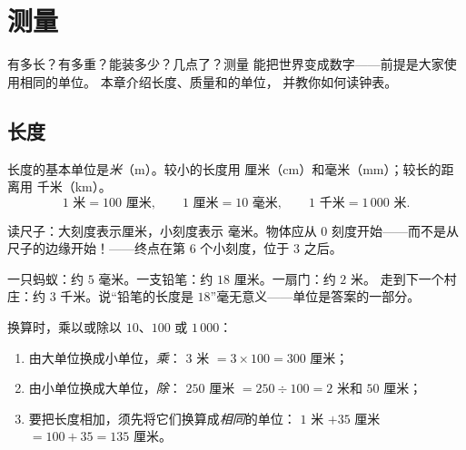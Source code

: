 \chapter{测量}\label{ch:g3:measure}

有多长？有多重？能装多少？几点了？测量
能把世界变成数字——前提是大家使用相同的单位。
本章介绍长度、质量和的单位，
并教你如何读钟表。

\section{长度}

\begin{definition}[长度单位]\label{def:g3:measure:length}
长度的基本单位是\emph{米}（m）。较小的长度用
厘米（cm）和毫米（mm）；较长的距离用
千米（km）。
\[
1 \text{ 米} = 100 \text{ 厘米}, \qquad
1 \text{ 厘米} = 10 \text{ 毫米}, \qquad
1 \text{ 千米} = 1\,000 \text{ 米}.
\]
\end{definition}

\begin{omfigure}

{\small 读尺子：大刻度表示厘米，小刻度表示
毫米。物体应从 $0$ 刻度开始——而不是从
尺子的边缘开始！——终点在第 $6$ 个小刻度，位于 $3$ 之后。}
\end{omfigure}

\begin{example}[选择合适的单位]\label{ex:g3:measure:choose}
一只蚂蚁：约 $5$ 毫米。一支铅笔：约 $18$ 厘米。一扇门：约 $2$ 米。
走到下一个村庄：约 $3$ 千米。说“铅笔的长度是
$18$”毫无意义——单位是答案的一部分。
\end{example}

\begin{method}[单位换算]\label{met:g3:measure:convert}
换算时，乘以或除以 $10$、$100$ 或 $1\,000$：
\begin{enumerate}
  \item 由大单位换成小单位，\emph{乘}：
        $3$ 米 $= 3 \times 100 = 300$ 厘米；
  \item 由小单位换成大单位，\emph{除}：
        $250$ 厘米 $= 250 \div 100 = 2$ 米和 $50$ 厘米；
  \item 要把长度相加，须先将它们换算成\emph{相同}的单位：
        $1$ 米 $+ 35$ 厘米 $= 100 + 35 = 135$ 厘米。
\end{enumerate}
\end{method}

